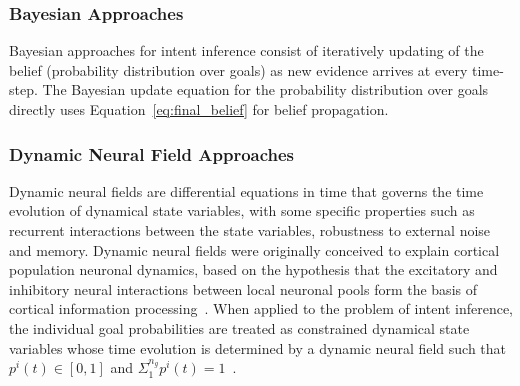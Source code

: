 \documentclass[conference]{IEEEtran}
\begin{document}
\subsubsection{Bayesian Approaches}
Bayesian approaches for intent inference consist of iteratively updating of the belief (probability distribution over goals) as new evidence arrives at every time-step. The Bayesian update equation for the probability distribution over goals directly uses Equation~\ref{eq:final_belief} for belief propagation. 


\subsubsection{Dynamic Neural Field Approaches}
Dynamic neural fields are differential equations in time that governs the time evolution of dynamical state variables, with some specific properties such as recurrent interactions between the state variables, robustness to external noise and memory. Dynamic neural fields were originally conceived to explain cortical population neuronal dynamics, based on the hypothesis that the excitatory and inhibitory neural interactions between local neuronal pools form the basis of cortical information processing~\citep{schoner2008dynamical}. 
When applied to the problem of intent inference, the individual goal probabilities are treated as constrained dynamical state variables whose time evolution is determined by a dynamic neural field such that $p^i(t) \in [0, 1]$ and $\Sigma_{1}^{n_g}p^{i}(t) = 1$~\citep{gopinath2017disamb}. 
\end{document}
